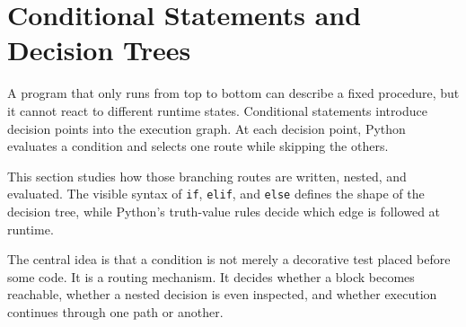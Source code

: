 \section{Conditional Statements and Decision Trees}

A program that only runs from top to bottom can describe a fixed procedure, but it cannot react to different runtime states. Conditional statements introduce decision points into the execution graph. At each decision point, Python evaluates a condition and selects one route while skipping the others.

This section studies how those branching routes are written, nested, and evaluated. The visible syntax of \texttt{if}, \texttt{elif}, and \texttt{else} defines the shape of the decision tree, while Python's truth-value rules decide which edge is followed at runtime.

The central idea is that a condition is not merely a decorative test placed before some code. It is a routing mechanism. It decides whether a block becomes reachable, whether a nested decision is even inspected, and whether execution continues through one path or another.